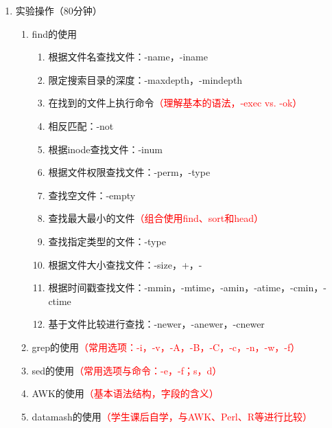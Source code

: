 \documentclass{TIJMUjiaoanSY}
\begin{document}
\begin{enumerate}
\otherTail
\newpage
\otherHeader

  \item 实验操作（80分钟）
    \begin{enumerate}
      \item find的使用
	\begin{enumerate}
	  \item 根据文件名查找文件：-name，-iname
	  \item 限定搜索目录的深度：-maxdepth，-mindepth
	  \item 在找到的文件上执行命令\textcolor{red}{（理解基本的语法，-exec vs. -ok）}
	  \item 相反匹配：-not
	  \item 根据inode查找文件：-inum
	  \item 根据文件权限查找文件：-perm，-type
	  \item 查找空文件：-empty
	  \item 查找最大最小的文件\textcolor{red}{（组合使用find、sort和head）}
	  \item 查找指定类型的文件：-type
	  \item 根据文件大小查找文件：-size，+，-
	  \item 根据时间戳查找文件：-mmin，-mtime，-amin，-atime，-cmin，-ctime
	  \item 基于文件比较进行查找：-newer，-anewer，-cnewer
	\end{enumerate}
      \item grep的使用\textcolor{red}{（常用选项：-i，-v，-A，-B，-C，-c，-n，-w，-f）}
      \item sed的使用\textcolor{red}{（常用选项与命令：-e，-f；s，d）}
      \item AWK的使用\textcolor{red}{（基本语法结构，字段的含义）}
      \item datamash的使用\textcolor{red}{（学生课后自学，与AWK、Perl、R等进行比较）}
    \end{enumerate}
\end{enumerate}


\otherTail
\end{document}
